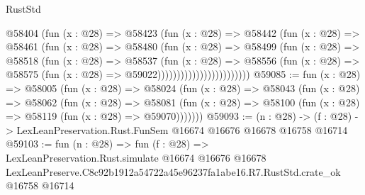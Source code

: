 \begin{lexlean}{RustStd}
\begin{coremodule}
                              @58404
                                (fun (x : @28) =>
                                @58423
                                  (fun (x : @28) =>
                                  @58442
                                    (fun (x : @28) =>
                                    @58461
                                      (fun (x : @28) =>
                                      @58480
                                        (fun (x : @28) =>
                                        @58499
                                          (fun (x : @28) =>
                                          @58518
                                            (fun (x : @28) =>
                                            @58537
                                              (fun (x : @28) =>
                                              @58556
                                                (fun (x : @28) =>
                                                @58575
                                                  (fun (x : @28) => @59022))))))))))))))))))))))))
@59085 := fun (x : @28) =>
  @58005
    (fun (x : @28) =>
    @58024
      (fun (x : @28) =>
      @58043
        (fun (x : @28) =>
        @58062
          (fun (x : @28) =>
          @58081 (fun (x : @28) => @58100 (fun (x : @28) => @58119 (fun (x : @28) => @59070)))))))
@59093 := (n : @28) ->
  (f : @28) -> LexLeanPreservation.Rust.FunSem @16674 @16676 @16678 @16758 @16714
@59103 := fun (n : @28) =>
  fun (f : @28) =>
  LexLeanPreservation.Rust.simulate
    @16674
    @16676
    @16678
    LexLeanPreserve.C8c92b1912a54722a45e96237fa1abe16.R7.RustStd.crate_ok
    @16758
    @16714
\end{coremodule}
\end{lexlean}
